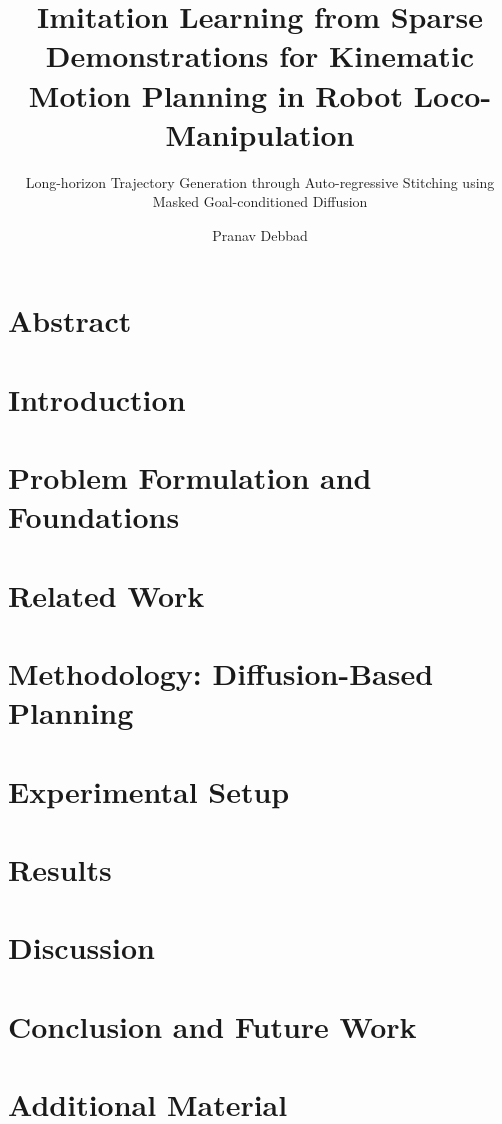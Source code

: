 \documentclass[
  a4paper,            %
  thesis=student,     %
  english,            %
  titlepage=false,    %
  oneside,            %
]{tumbook}
\title{Imitation Learning from Sparse Demonstrations for Kinematic Motion Planning in Robot Loco-Manipulation}
\subtitle{Long-horizon Trajectory Generation through Auto-regressive Stitching using Masked Goal-conditioned Diffusion}
\author{Pranav Debbad}
\begin{document}
\frontmatter
\maketitle
\chapter{Abstract}

\tableofcontents

\listoffigures
\listoftables

\mainmatter
\chapter{Introduction}


\chapter{Problem Formulation and Foundations}


\chapter{Related Work}


\chapter{Methodology: Diffusion-Based Planning}


\chapter{Experimental Setup}


\chapter{Results}


\chapter{Discussion}


\chapter{Conclusion and Future Work}


\appendix
\chapter{Additional Material}


\backmatter


\end{document}
